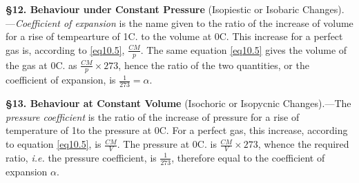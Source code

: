 \documentclass[oneside,12pt]{book}
\begin{document}
\textbf{\S 12. Behaviour under Constant Pressure} (Isopiestic or Isobaric Changes).---\textit{Coefficient of expansion} is the name given to the ratio of the increase of volume for a rise of tempearture of 1\degree C. to the volume at 0\degree C. This increase for a perfect gas is, according to \eqref{eq10.5}, $\frac{CM}{p}$. The same equation \eqref{eq10.5} gives the volume of the gas at 0\degree C. as $\frac{CM}{p}\times 273$, hence the ratio of the two quantities, or the coefficient of expansion, is $\frac{1}{273}=\alpha$. \par 

\textbf{\S 13. Behaviour at Constant Volume} (Isochoric or Isopycnic Changes).---The \textit{pressure coefficient} is the ratio of the increase of pressure for a rise of temperature of 1\degree to the pressure at 0\degree C. For a perfect gas, this increase, according to equation \eqref{eq10.5}, is $\frac{CM}{V}$. The pressure at 0\degree C. is $\frac{CM}{V}\times 273$, whence the required ratio, \textit{i.e.} the pressure coefficient, is $\frac{1}{273}$, therefore equal to the coefficient of expansion $\alpha$. \par 
\end{document}
